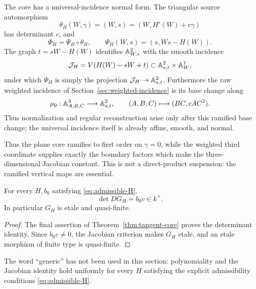 The core has a universal-incidence normal form.  The triangular source
automorphism
\[
 \theta_H(W,\gamma)=(W,s)=(W,H'(W)+c\gamma)
\]
has determinant $c$, and
\[
 \Phi_H=\Psi_H\circ\theta_H,\qquad
 \Psi_H(W,s)=(s,Ws-H(W)).
\]
The graph $t=sW-H(W)$ identifies $\mathbb A^2_{W,s}$ with the smooth incidence
\[
 \mathcal J_H=V(H(W)-sW+t)
 \subset\mathbb A^2_{s,t}\times\mathbb A^1_W,
\]
under which $\Psi_H$ is simply the projection
$\mathcal J_H\to\mathbb A^2_{s,t}$.  Furthermore the raw weighted incidence of
Section~\ref{sec:weighted-incidence} is its base change along
\[
 \mu_0:\mathbb A^3_{A,B,C}\longrightarrow\mathbb A^2_{s,t},\qquad
 (A,B,C)\longmapsto(BC,cAC^2).
\]
Thus normalization and regular reconstruction arise only after this
ramified base change; the universal incidence itself is already affine,
smooth, and normal.

Thus the plane core ramifies to first order on $\gamma=0$, while the weighted
third coordinate supplies exactly the boundary factors which make the
three-dimensional Jacobian constant.  This is not a direct-product
suspension: the ramified vertical maps are essential.

\begin{proposition}\label{prop:weighted-jacobian}
For every $H,b_0$ satisfying \eqref{eq:admissible-H},
\[
 \det DG_H=b_0c\in k^\times.
\]
In particular $G_H$ is etale and quasi-finite.
\end{proposition}

\begin{proof}
The final assertion of Theorem~\ref{thm:tangent-core} proves the determinant
identity.  Since $b_0c\ne0$, the Jacobian criterion makes $G_H$ etale, and an
etale morphism of finite type is quasi-finite.
\end{proof}


The word ``generic'' has not been used in this section: polynomiality and the
Jacobian identity hold uniformly for every $H$ satisfying the explicit
admissibility conditions \eqref{eq:admissible-H}.
